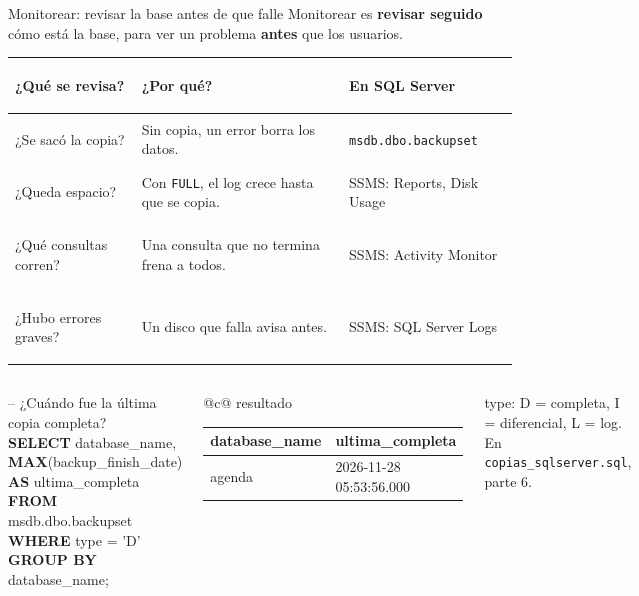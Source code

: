 \documentclass[aspectratio=169,10pt,c]{beamer}
\makeatletter
\newcommand{\kw}[1]{\textcolor{utpRojo}{\textbf{#1}}}
\newcommand{\com}[1]{\textcolor{utpGrisMedio}{#1}}
\newcommand{\gris}[1]{\textcolor{utpGris}{#1}}
\newenvironment{sqlmicro}[1][.86\textwidth]
  {\begin{center}\begin{lrbox}{\sqlbuf}\begin{minipage}{#1}\ttfamily\fontsize{6.4}{7.5}\selectfont\vspace{4pt}\raggedright}
  {\vspace{4pt}\end{minipage}\end{lrbox}\colorbox{utpGrisClaro}{\usebox{\sqlbuf}}\end{center}}
\newcommand{\col}{\dimexpr\textwidth-2\fboxsep\relax}
\newcommand{\ind}{\hspace*{1.2em}}
\newcommand{\cab}[1]{\normalfont\bfseries #1}
\newcommand{\tablita}[4]{%
  \begin{tabular}[t]{@{}c@{}}
  {\scriptsize\color{utpGris}#1}\\[2pt]
  {\scriptsize\ttfamily
  \begin{tabular}[t]{#2}
  \toprule
  #3 \\
  \midrule
  #4
  \bottomrule
  \end{tabular}}
  \end{tabular}}
\makeatother
\begin{document}
\begin{frame}{Monitorear: revisar la base antes de que falle}
\small Monitorear es \textbf{revisar seguido} cómo está la base, para ver un problema \textbf{antes} que los usuarios.
\vspace{0.1cm}
\begin{center}
\footnotesize
\renewcommand{\arraystretch}{1.25}
\begin{tabular}{@{}>{\bfseries\raggedright}p{3.1cm}>{\raggedright}p{4.9cm}>{\raggedright\arraybackslash}p{3.9cm}@{}}
\toprule
¿Qué se revisa? & ¿Por qué? & En SQL Server \\
\midrule
¿Se sacó la copia? & Sin copia, un error borra los datos. & \texttt{msdb.dbo.backupset} \\
¿Queda espacio? & Con \texttt{FULL}, el log crece hasta que se copia. & SSMS: Reports, Disk Usage \\
¿Qué consultas corren? & Una consulta que no termina frena a todos. & SSMS: Activity Monitor \\
¿Hubo errores graves? & Un disco que falla avisa antes. & SSMS: SQL Server Logs \\
\bottomrule
\end{tabular}
\end{center}
\begin{columns}[c,onlytextwidth]
\begin{sqlmicro}[\col]
\com{-- ¿Cuándo fue la última copia completa?}\\
\kw{SELECT} database\_name,\\
\ind\kw{MAX}(backup\_finish\_date) \kw{AS} ultima\_completa\\
\kw{FROM} msdb.dbo.backupset\\
\kw{WHERE} type = 'D'\\
\kw{GROUP BY} database\_name;
\end{sqlmicro}
\centering\tablita{resultado}{ll}{\cab{database\_name} & \cab{ultima\_completa}}{agenda & 2026-11-28 05:53:56.000 \\}\par
\vspace{4pt}
{\centering\scriptsize\gris{type: D = completa, I = diferencial, L = log.}\\[3pt]
\gris{En \texttt{copias\_sqlserver.sql}, parte 6.}\par}
\end{columns}
\end{frame}
\end{document}
